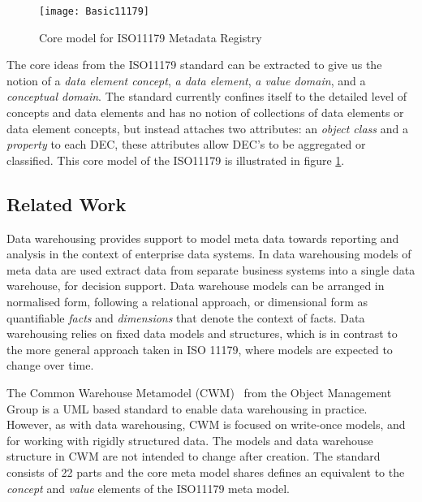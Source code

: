 \begin{figure}[here]
	\texttt{[image: Basic11179]}
	\caption{Core model for ISO11179 Metadata Registry} 
	\label{fig:basicMDR}
\end{figure}

The core ideas from the ISO11179 standard can be extracted to give us the notion of a \emph{data element concept}, \emph{a data element}, \emph{a value domain}, and a \emph{conceptual domain}. The standard currently confines itself to the detailed level of concepts and data elements and has no notion of collections of data elements or data element concepts, but instead attaches two attributes: an \emph{object class} and a \emph{property} to each DEC, these attributes allow DEC's to be aggregated or classified. This core model of the ISO11179 is illustrated in figure \ref{fig:basicMDR}.





\subsection{Related Work}

Data warehousing provides support to model meta data towards reporting and analysis in the context of enterprise data systems. In data warehousing models of meta data are used extract data from separate business systems into a single data warehouse, for decision support. Data warehouse models can be arranged in normalised form, following a relational approach, or dimensional form as quantifiable \emph{facts} and \emph{dimensions} that denote the context of facts. Data warehousing relies on fixed data models and structures, which is in contrast to the more general approach taken in ISO 11179, where models are expected to change over time. 

The Common Warehouse Metamodel (CWM)~\cite{poole03} from the Object Management Group is a UML based standard to enable data warehousing in practice. However, as with data warehousing, CWM is focused on write-once models, and for working with rigidly structured data. The models and data warehouse structure in CWM are not intended to change after creation. The standard consists of 22 parts and the core meta model shares defines an equivalent to the \emph{concept} and \emph{value} elements of the ISO11179 meta model.

